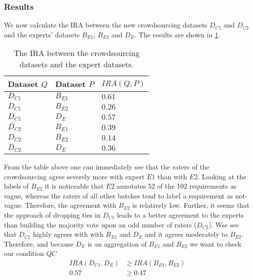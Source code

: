 \subsubsection{Results}
We now calculate the \ac{IRA} between the new crowdsourcing datasets $D_{C1}$ and $D_{C2}$ and the experts' datasets $B_{E1}$, $B_{E2}$ and $D_{E}$.
The results are shown in \cref{tab:study:objects:crowdsourcing:batches:IRA:majority}.
\begin{table}[htpb]
    \centering
    \begin{tabular}{l l l}
        \toprule
        Dataset $Q$ & Dataset $P$ & $IRA(Q, P)$ \\
        \midrule
        $D_{C1}$ & $B_{E1}$ & $0.61$\\
        $D_{C1}$ & $B_{E2}$ & $0.26$\\
        $D_{C1}$ & $D_{E}$ & $0.57$\\
        $D_{C2}$ & $B_{E1}$ & $0.39$\\
        $D_{C2}$ & $B_{E2}$ & $0.14$\\
        $D_{C2}$ & $D_{E}$ & $0.36$\\
        \bottomrule
    \end{tabular}
    \caption[Inter rater agreement between crowdsourcing datasets and expert datasets]{The \ac{IRA} between the crowdsourcing datasets and the expert datasets.}\label{tab:study:objects:crowdsourcing:batches:IRA:majority}
\end{table}

From the table above one can immediately see that the raters of the crowdsourcing agree severely more with expert $E1$ than with $E2$.
Looking at the labels of $B_{E2}$ it is noticeable that $E2$ annotates 52 of the 102 requirements as vague, whereas the raters of all other batches tend to label a requirement as not-vague.
Therefore, the agreement with $B_{E2}$ is relatively low.
Further, it seems that the approach of dropping ties in $D_{C1}$ leads to a better agreement to the experts than building the majority vote upon an odd number of raters ($D_{C2}$).
Wse see that $D_{C1}$ highly agrees with with $B_{E1}$ and $D_{E}$ and it agrees moderately to $B_{E2}$.
Therefore, and because $D_{E}$ is an aggregation of $B_{E1}$ and $B_{E2}$ we want to check our condition $QC$
\begin{equation}
    \begin{aligned}
        IRA(D_{C1}, D_E) &\ge IRA(B_{E1}, B_{E2})\\
        0.57 &\ge 0.47
    \end{aligned}
\end{equation}

